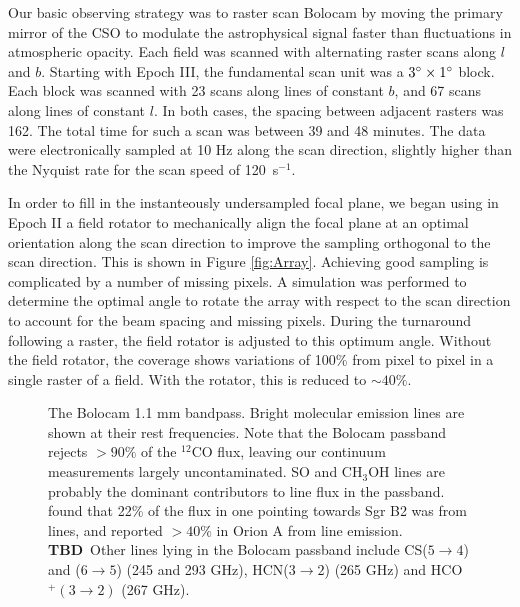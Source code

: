 \documentclass[12pt,preprint]{aastex}
\newcommand{\TBD}{{\bf TBD}}
\def\Figure#1#2#3#4{
\begin{figure}[htb]
\epsscale{#4}
\plotone{#1}
\caption{#2}
\label{#3}
\end{figure}
}
\begin{document}


Our basic observing strategy was to raster scan Bolocam by moving the
primary mirror of the CSO to modulate the astrophysical signal faster
than fluctuations in atmospheric opacity.  Each field was scanned with
alternating raster scans along $l$ and $b$.  Starting with Epoch III,
the fundamental scan unit was a $3\mbox{$^\circ$} \times 1\mbox{$^\circ$}$ block.
Each block was scanned with 23 scans along lines of constant $b$, and
67 scans along lines of constant $l$.  In both cases, the spacing
between adjacent rasters was 162\arcsec.  The total time for such a
scan was between 39 and 48 minutes.  The data were electronically
sampled at 10 Hz along the scan direction, slightly higher than the
Nyquist rate for the scan speed of 120\arcsec\ s$^{-1}$.


In order to fill in the instanteously undersampled focal plane, we
began using in Epoch II a field rotator to mechanically align the
focal plane at an optimal orientation along the scan direction to
improve the sampling orthogonal to the scan direction.  This is shown
in Figure \ref{fig:Array}.  Achieving good sampling is complicated by
a number of missing pixels.  A simulation was performed to determine
the optimal angle to rotate the array with respect to the scan
direction to account for the beam spacing and missing pixels.  During
the turnaround following a raster, the field rotator is adjusted to
this optimum angle.
Without the field rotator, the coverage shows variations of 100\% from
pixel to pixel in a single raster of a field.  With the rotator, this
is reduced to $\sim40\%$.  


\Figure{bolocam_bandpass}{The Bolocam 1.1 mm bandpass.  Bright
molecular emission lines are shown at their rest frequencies.  Note
that the Bolocam passband rejects $>90\%$ of the $^{12}$CO flux,
leaving our continuum measurements largely uncontaminated.  SO and
CH$_3$OH lines are probably the dominant contributors to line flux in
the passband.  \citet{nummelin1998} found that 22\% of the flux in one
pointing towards Sgr B2 was from lines, and \citet{yoshida2005}
reported $>40\%$ in Orion A from line emission. \TBD\ Other lines
lying in the Bolocam passband include CS($5\to4$) and ($6\to5$) (245
and 293 GHz), HCN($3\to2$) (265 GHz) and HCO$^+(3\to2)$ (267 GHz).}
{fig:Bandpass}{1.0}
\end{document}
